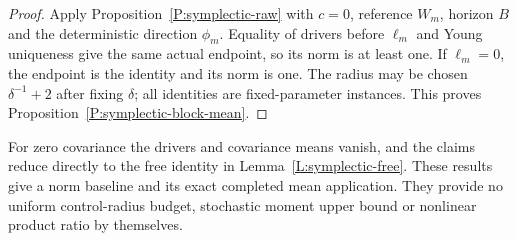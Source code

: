 \begin{proof}
  Apply Proposition~\ref{P:symplectic-raw} with $c=0$, reference
  $W_m$, horizon $B$ and the deterministic direction $\phi_m$.
  Equality of drivers before $\ell_m$ and Young uniqueness
  give the same actual endpoint, so its norm is at least one.
  If $\ell_m=0$, the endpoint is the identity and its norm is one.
  The radius may be chosen $\delta^{-1}+2$ after fixing $\delta$;
  all identities are fixed-parameter instances.
  This proves Proposition~\ref{P:symplectic-block-mean}.
\end{proof}

For zero covariance the drivers and covariance means vanish, and the
claims reduce directly to the free identity in Lemma~\ref{L:symplectic-free}.
These results give a norm baseline and its exact completed mean
application. They provide no uniform control-radius budget, stochastic
moment upper bound or nonlinear product ratio by themselves.

